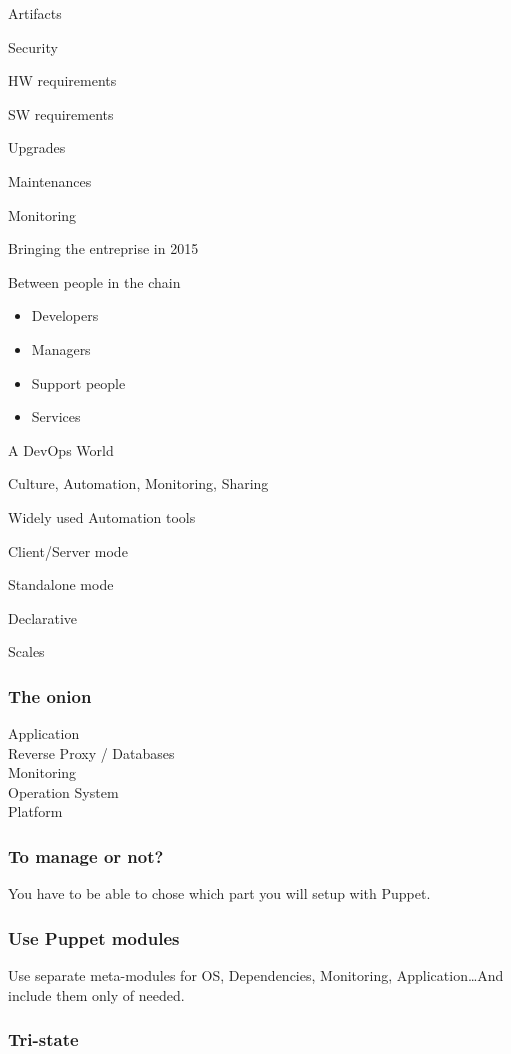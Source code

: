 \begin{iframe}
\item Artifacts
\item Security
\item HW requirements
\item SW requirements
\item Upgrades
\item Maintenances
\item Monitoring
\end{iframe}
\begin{iframe}
\item Bringing the entreprise in 2015
\item Between people in the chain
    \begin{itemize}
        \item Developers
        \item Managers
        \item Support people
        \item Services
    \end{itemize}
\item A DevOps World
\item Culture, Automation, Monitoring, Sharing
\end{iframe}

\begin{iframe}[Puppet]
\item Widely used Automation tools
\item Client/Server mode
\item Standalone mode
\item Declarative
\item Scales
\end{iframe}

\begin{frame}
    \frametitle{The onion}
    \huge
    Application\\
    Reverse Proxy / Databases\\
    Monitoring\\
    Operation System\\
    Platform
\end{frame}

\begin{frame}
    \frametitle{To manage or not?}
    \huge You have to be able to chose which part you will setup with Puppet.
\end{frame}
\begin{frame}
    \frametitle{Use Puppet modules}
    \huge Use separate meta-modules for OS, Dependencies, Monitoring, Application\dots And include them only of needed.
\end{frame}

\begin{frame}
    \frametitle{Tri-state}
\end{frame}


\thankyouSlide
\renewcommand{\insertLogo}{}
\contactSlide
